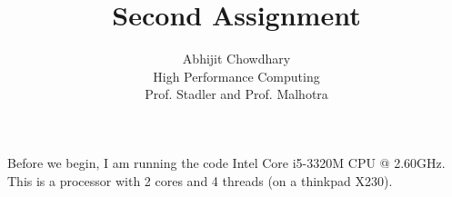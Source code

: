 \documentclass[12pt]{article}
\begin{document}
 

 
\title{Second Assignment}%
\author{Abhijit Chowdhary\\ %
High Performance Computing \\
Prof. Stadler and Prof. Malhotra} %

\maketitle

Before we begin, I am running the code Intel Core i5-3320M CPU @ 2.60GHz. This
is a processor with 2 cores and 4 threads (on a thinkpad X230).
\end{document}
